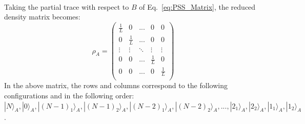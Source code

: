 \\
Taking the partial trace with respect to $B$ of Eq.~\eqref{eq:PSS_Matrix}, the reduced density matrix becomes:
%
\begin{equation}
\rho_{A} = \begin{pmatrix}
\frac{1}{L} & 0 &... & 0 & 0 \\
0 & \frac{1}{L} & ... & 0 & 0 \\
\vdots & \vdots & \ddots & \vdots & \vdots \\
0 & 0 & ... & \frac{1}{L} & 0 \\
0 & 0 & ... & 0 & \frac{1}{L} \\
\end{pmatrix}
\end{equation}
%
In the above matrix, the rows and columns correspond to the following configurations and in the following order: $| N \rangle_{A} , |0 \rangle_{A} , | (N-1)_1 \rangle_{A}, |(N-1)_2 \rangle_{A} , | (N-2)_1 \rangle_{A} , | (N-2)_2 \rangle_{A} , ... , |2_1 \rangle_{A} , |2_2 \rangle_{A} , |1_1 \rangle_{A} , |1_2 \rangle_{A} $.

